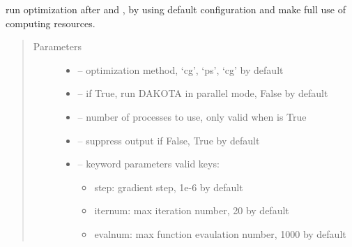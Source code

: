 \documentclass[letterpaper,10pt,english]{sphinxmanual}
\begin{document}
\begin{fulllineitems}
\begin{fulllineitems}
\begin{quote}
\begin{description}
\begin{itemize}
\end{itemize}

\end{description}\end{quote}

\end{fulllineitems}


\begin{fulllineitems}
\label{\detokenize{src/apidocs/genopt:genopt.DakotaOC.simple_run}}
run optimization after  and ,
by using default configuration and make full use of computing resources.
\begin{quote}\begin{description}
\item[{Parameters}] \leavevmode\begin{itemize}
\item {} 
 -- optimization method, `cg', `ps', `cg' by default

\item {} 
 -- if True, run DAKOTA in parallel mode, False by default

\item {} 
 -- number of processes to use, only valid when  is True

\item {} 
 -- suppress output if False, True by default

\item {} 
 -- 
keyword parameters
valid keys:
\begin{itemize}
\item {} 
step: gradient step, 1e-6 by default

\item {} 
iternum: max iteration number, 20 by default

\item {} 
evalnum: max function evaulation number, 1000 by default

\end{itemize}


\end{itemize}

\end{description}\end{quote}

\end{fulllineitems}


\begin{fulllineitems}
\label{\detokenize{src/apidocs/genopt:genopt.DakotaOC.vcors}}
\end{fulllineitems}


\end{fulllineitems}
\end{document}
